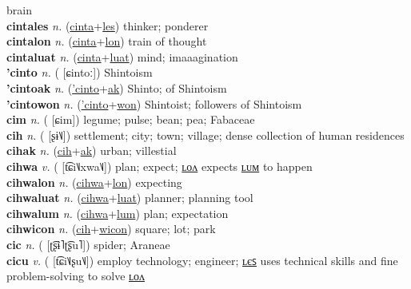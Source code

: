 brain \label{cintaec} \\
\textbf{cintales} \textit{n.} (\hyperref[cinta]{cinta}+\hyperref[les]{les})
thinker; ponderer \label{cintales} \\
\textbf{cintalon} \textit{n.} (\hyperref[cinta]{cinta}+\hyperref[lon]{lon})
train of thought \label{cintalon} \\
\textbf{cintaluat} \textit{n.} (\hyperref[cinta]{cinta}+\hyperref[luat]{luat})
mind; imaaagination \label{cintaluat} \\
\textbf{'cinto} \textit{n.} ( [ɕintoː])
Shintoism \label{'cinto} \\
\textbf{'cintoak} \textit{n.} (\hyperref['cinto]{'cinto}+\hyperref[ak]{ak})
Shinto; of Shintoism \label{'cintoak} \\
\textbf{'cintowon} \textit{n.} (\hyperref['cinto]{'cinto}+\hyperref[won]{won})
Shintoist; followers of Shintoism \label{'cintowon} \\
\textbf{cim} \textit{n.} ( [ɕim])
legume; pulse; bean; pea; Fabaceae \label{cim} \\
\textbf{cih} \textit{n.} ( [ʂɨ˥˩])
settlement; city; town; village; dense collection of human residences \label{cih} \\
\textbf{cihak} \textit{n.} (\hyperref[cih]{cih}+\hyperref[ak]{ak})
urban; villestial \label{cihak} \\
\textbf{cihwa} \textit{v.} ( [t͡ɕi˥˩xwa˥˩])
plan; expect; \hyperref[cihwalon]{ʟᴏᴧ} expects \hyperref[cihwalum]{ʟᴜᴍ} to happen \label{cihwa} \\
\textbf{cihwalon} \textit{n.} (\hyperref[cihwa]{cihwa}+\hyperref[lon]{lon})
expecting \label{cihwalon} \\
\textbf{cihwaluat} \textit{n.} (\hyperref[cihwa]{cihwa}+\hyperref[luat]{luat})
planner; planning tool \label{cihwaluat} \\
\textbf{cihwalum} \textit{n.} (\hyperref[cihwa]{cihwa}+\hyperref[lum]{lum})
plan; expectation \label{cihwalum} \\
\textbf{cihwicon} \textit{n.} (\hyperref[cih]{cih}+\hyperref[wicon]{wicon})
square; lot; park \label{cihwicon} \\
\textbf{cic} \textit{n.} ( [ʈ͡ʂɨ˥ʈ͡ʂu˥])
spider; Araneae \label{cic} \\
\textbf{cicu} \textit{v.} ( [t͡ɕi˥˩ʂu˥˩])
employ technology; engineer; \hyperref[cicules]{ʟєꜱ} uses technical skills and fine problem-solving to solve \hyperref[ciculon]{ʟᴏᴧ} \label{cicu} \\
